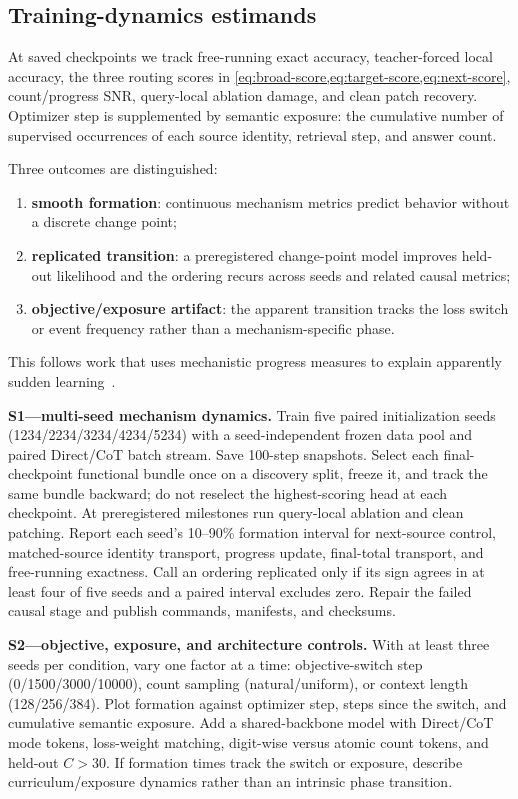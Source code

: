 \subsection{Training-dynamics estimands}

At saved checkpoints we track free-running exact accuracy, teacher-forced local accuracy, the three routing scores in \cref{eq:broad-score,eq:target-score,eq:next-score}, count/progress SNR, query-local ablation damage, and clean patch recovery. Optimizer step is supplemented by semantic exposure: the cumulative number of supervised occurrences of each source identity, retrieval step, and answer count.

Three outcomes are distinguished:
\begin{enumerate}
  \item \textbf{smooth formation}: continuous mechanism metrics predict behavior without a discrete change point;
  \item \textbf{replicated transition}: a preregistered change-point model improves held-out likelihood and the ordering recurs across seeds and related causal metrics;
  \item \textbf{objective/exposure artifact}: the apparent transition tracks the loss switch or event frequency rather than a mechanism-specific phase.
\end{enumerate}
This follows work that uses mechanistic progress measures to explain apparently sudden learning~\citep{nanda2023grokking,olsson2022induction}.

\begin{todobox}
\textbf{S1---multi-seed mechanism dynamics.}
Train five paired initialization seeds (1234/2234/3234/4234/5234) with a seed-independent frozen data pool and paired Direct/CoT batch stream. Save 100-step snapshots. Select each final-checkpoint functional bundle once on a discovery split, freeze it, and track the same bundle backward; do not reselect the highest-scoring head at each checkpoint. At preregistered milestones run query-local ablation and clean patching. Report each seed's 10--90\% formation interval for next-source control, matched-source identity transport, progress update, final-total transport, and free-running exactness. Call an ordering replicated only if its sign agrees in at least four of five seeds and a paired interval excludes zero. Repair the failed causal stage and publish commands, manifests, and checksums.
\end{todobox}

\begin{todobox}
\textbf{S2---objective, exposure, and architecture controls.}
With at least three seeds per condition, vary one factor at a time: objective-switch step (0/1500/3000/10000), count sampling (natural/uniform), or context length (128/256/384). Plot formation against optimizer step, steps since the switch, and cumulative semantic exposure. Add a shared-backbone model with Direct/CoT mode tokens, loss-weight matching, digit-wise versus atomic count tokens, and held-out \(C>30\). If formation times track the switch or exposure, describe curriculum/exposure dynamics rather than an intrinsic phase transition.
\end{todobox}

